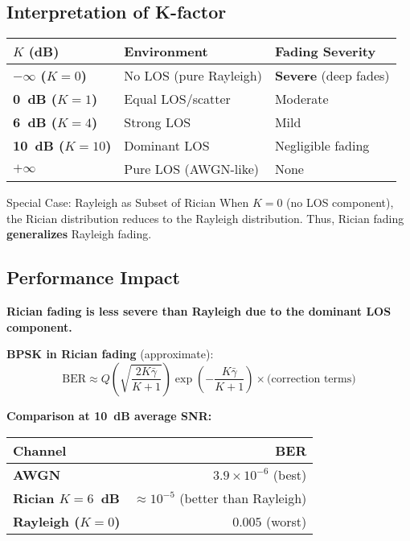 \subsection{Interpretation of K-factor}

\begin{center}
\begin{tabular}{@{}lll@{}}
\toprule
$K$ (dB) & Environment & Fading Severity \\
\midrule
\textbf{$-\infty$ ($K=0$)} & No LOS (pure Rayleigh) & \textbf{Severe} (deep fades) \\
\textbf{0~dB ($K=1$)} & Equal LOS/scatter & Moderate \\
\textbf{6~dB ($K=4$)} & Strong LOS & Mild \\
\textbf{10~dB ($K=10$)} & Dominant LOS & Negligible fading \\
\textbf{$+\infty$} & Pure LOS (AWGN-like) & None \\
\bottomrule
\end{tabular}
\end{center}

\begin{calloutbox}{Special Case: Rayleigh as Subset of Rician}
When $K = 0$ (no LOS component), the Rician distribution reduces to the Rayleigh distribution. Thus, Rician fading \textbf{generalizes} Rayleigh fading.
\end{calloutbox}

\subsection{Performance Impact}

\textbf{Rician fading is less severe than Rayleigh due to the dominant LOS component.}

\textbf{BPSK in Rician fading} (approximate):
\begin{equation}
\text{BER} \approx Q\left(\sqrt{\frac{2K\bar{\gamma}}{K+1}}\right) \exp\left(-\frac{K\bar{\gamma}}{K+1}\right) \times \text{(correction terms)}
\label{eq:bpsk-rician-ber}
\end{equation}

\textbf{Comparison at 10~dB average SNR:}
\begin{center}
\begin{tabular}{@{}lr@{}}
\toprule
Channel & BER \\
\midrule
\textbf{AWGN} & $3.9 \times 10^{-6}$ (best) \\
\textbf{Rician $K=6$~dB} & $\approx 10^{-5}$ (better than Rayleigh) \\
\textbf{Rayleigh ($K=0$)} & $0.005$ (worst) \\
\bottomrule
\end{tabular}
\end{center}

